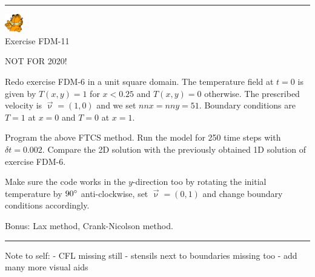 \vspace{1cm}

\begin{center}
\begin{minipage}[t]{0.77\textwidth}
\par\noindent\rule{\textwidth}{0.4pt}

\begin{center}
\includegraphics[width=0.8cm]{images/garftr} \\
{\color{orange}Exercise FDM-11}
\end{center}

NOT FOR 2020! 

Redo exercise FDM-6 in a unit square domain. 
The temperature field at $t=0$ is 
given by $T(x,y)=1$ for $x<0.25$ and $T(x,y)=0$ otherwise. The prescribed 
velocity is $\vec\upnu=(1,0)$ and we set $nnx=nny=51$.
Boundary conditions are $T=1$ at $x=0$ and $T=0$ at $x=1$.

Program the above FTCS method. Run the model for 250 time steps with $\delta t=0.002$. 
Compare the 2D solution with the previously obtained 1D solution of exercise FDM-6.

Make sure the code works in the $y$-direction too by rotating the initial temperature 
by $90\degree$ anti-clockwise, set $\vec{\upnu}=(0,1)$ and change boundary conditions accordingly. 

Bonus: Lax method, Crank-Nicolson method.

\par\noindent\rule{\textwidth}{0.4pt}
\end{minipage}
\end{center}

Note to self:
- CFL missing still
- stensils next to boundaries missing too
- add many more visual aids










